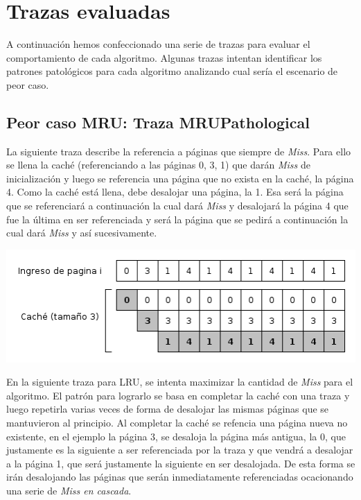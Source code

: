 \documentclass[11pt, a4paper, spanish]{article}
\begin{document}
\newpage
\section{Trazas evaluadas}

A continuaci\'on hemos confeccionado una serie de trazas para evaluar el comportamiento de cada algoritmo. Algunas trazas intentan identificar
los patrones patol\'ogicos para cada algoritmo analizando cual ser\'ia el escenario de peor caso.

\subsection{ Peor caso MRU: Traza MRUPathological}


	La siguiente traza describe la referencia a p\'aginas que siempre de \textit{Miss}. Para ello se llena la cach\'e (referenciando a las 
p\'aginas 0, 3, 1) que dar\'an \textit{Miss} de inicializaci\'on y luego se referencia una p\'agina que no exista en la cach\'e, la p\'agina 4.
Como la cach\'e est\'a llena, debe desalojar una p\'agina, la 1. Esa ser\'a la p\'agina que se referenciar\'a a continuaci\'on la cual dar\'a \textit{Miss}
y desalojar\'a la p\'agina 4 que fue la \'ultima en ser referenciada y ser\'a la p\'agina que se pedir\'a a continuaci\'on la cual dar\'a \textit{Miss} y
as\'i sucesivamente.

	\begin{center}
	\includegraphics[scale=0.65]{diagramas/MRUPathological.png}\\
	\end{center}


	En la siguiente traza para LRU, se intenta maximizar la cantidad de \textit{Miss} para el algoritmo. El patr\'on para lograrlo se basa
en completar la cach\'e con una traza y luego repetirla varias veces de forma de desalojar las mismas p\'aginas que se mantuvieron al principio.
Al completar la cach\'e se refencia una p\'agina nueva no existente, en el ejemplo la p\'agina 3, se desaloja la p\'agina m\'as antigua, la 0, que 
justamente es la siguiente a ser referenciada por la traza y que vendr\'a a desalojar a la p\'agina 1, que ser\'a justamente la siguiente en ser 
desalojada. De esta forma se ir\'an desalojando las p\'aginas que ser\'an inmediatamente referenciadas ocacionando una serie de \textit{Miss en cascada}. 
\end{document}
